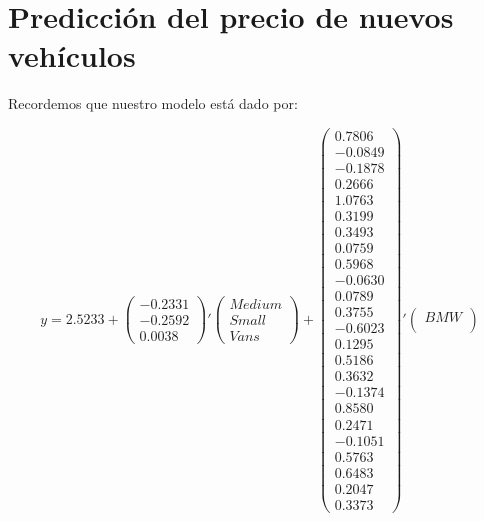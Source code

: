 \documentclass[11pt]{article}
\begin{document}
    \hypertarget{predicciuxf3n-del-precio-de-nuevos-vehuxedculos}{%
\section{Predicción del precio de nuevos
vehículos}\label{predicciuxf3n-del-precio-de-nuevos-vehuxedculos}}

    Recordemos que nuestro modelo está dado por:

    \begin{equation}
    y = 2.5233 + \begin{pmatrix}
       -0.2331 \\
       -0.2592 \\ 
       0.0038
    \end{pmatrix}' \begin{pmatrix}
       Medium \\
       Small \\ 
       Vans
    \end{pmatrix} + \begin{pmatrix}
        0.7806 \\
       -0.0849 \\ 
       -0.1878 \\
        0.2666 \\
        1.0763 \\
        0.3199 \\
        0.3493 \\
        0.0759 \\
        0.5968 \\
       -0.0630 \\
        0.0789 \\
        0.3755 \\
       -0.6023 \\
        0.1295 \\
        0.5186 \\
        0.3632 \\
       -0.1374 \\
        0.8580 \\
        0.2471 \\
       -0.1051 \\
        0.5763 \\
        0.6483 \\
        0.2047 \\
        0.3373
    \end{pmatrix}' \begin{pmatrix}
       BMW \\

\end{pmatrix}
\end{equation}
\end{document}

